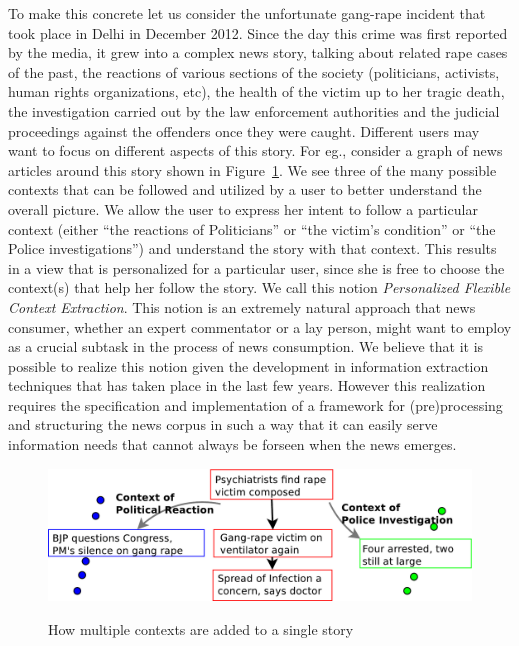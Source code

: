 To make this concrete let us consider the unfortunate gang-rape
incident that took place in Delhi in December 2012. Since the day this
crime was first reported by the media, it grew into a complex news
story, talking about related rape cases of the past, the reactions of
various sections of the society (politicians, activists, human rights
organizations, etc), the health of the victim up to her tragic death,
the investigation carried out by the law enforcement authorities and
the judicial proceedings against the offenders once they were
caught. Different users may want to focus on different aspects of this
story. For eg., consider a graph of news articles around this story
shown in Figure~\ref{fig:context-adding-graph-gang-rape-1}.  We see
three of the many possible contexts that can be followed and utilized
by a user to better understand the overall picture. We allow the user
to express her intent to follow a particular context (either ``the
reactions of Politicians'' or ``the victim's condition'' or ``the
Police investigations'') and understand the story with that
context. This results in a view that is personalized for a particular
user, since she is free to choose the context(s) that help her follow
the story. We call this notion \emph{Personalized Flexible Context
  Extraction}. This notion is an extremely natural approach that news
consumer, whether an expert commentator or a lay person, might want to
employ as a crucial subtask in the process of news consumption. We
believe that it is possible to realize this notion given the
development in information extraction techniques that has taken place
in the last few years. However this realization requires the
specification and implementation of a  framework for
(pre)processing and structuring the news corpus in such a way that it
can easily serve information needs that cannot always be forseen when
the news emerges.

\begin{figure}[ht]
\caption{How multiple contexts are added to a single story}
\includegraphics[scale=0.31]{figures/graph-3.pdf}
\label{fig:context-adding-graph-gang-rape-1}
\end{figure}


